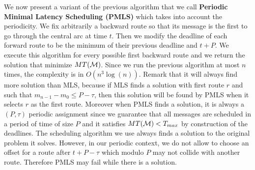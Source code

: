 \documentclass[10pt, conference, letterpaper]{IEEEtran}
\begin{document}
     We now present a variant of the previous algorithm that we call {\bf Periodic Minimal Latency Scheduling (PMLS)}
     which takes into account the periodicity. We fix arbitrarily a backward route so that its message is the first to go through the central arc at time $t$. Then we modify the deadline of each forward route to be the minimum of their previous deadline and $t + P$.  We execute this algorithm for every possible first backward route and we return the solution that minimize $MT({\cal M})$. Since we run the previous algorithm at most $n$ times, the complexity is in $O(n^3\log(n))$. Remark that it will always find more solution than MLS,
     because if MLS finds a solution with first route $r$ and such that $m_{n-1} - m_0 \leq P -\tau$, then this solution will be found by PMLS when it selects $r$ as the first route. Moreover when PMLS finds a solution, it is always a $(P,\tau)$ periodic assignment
     since we guarantee that all messages are scheduled in a period of time of size $P$ and it satisfies $MT({\cal M}) < T_{max}$ by construction of the deadlines. The scheduling algorithm we use always finds a solution to the  original problem it solves. However, in our periodic context, we do not allow to choose an offset for a route after $t+P- \tau$ which modulo $P$ may not collide with another route. Therefore PMLS may fail while there is a solution.
     
%   
%     
% 
%     
% 
% 
\end{document}

